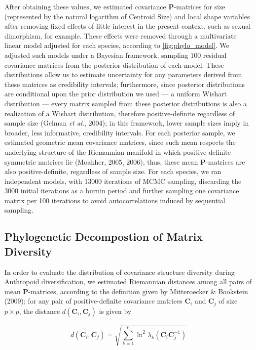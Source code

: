 \documentclass[12pt,twoside]{report}
\begin{document}
After obtaining these values, we estimated covariance
$\mathbf{P}$-matrices for size (represented by the natural logarithm of
Centroid Size) and local shape variables after removing fixed effects of
little interest in the present context, such as sexual dimorphism, for
example. These effects were removed through a multivariate linear model
adjusted for each species, according to \autoref{fig:phylo_model}. We
adjusted such models under a Bayesian framework, sampling $100$ residual
covariance matrices from the posterior distribution of each model. These
distributions allow us to estimate uncertainty for any parameters
derived from these matrices as credibility intervals; furthermore, since
posterior distributions are conditional upon the prior distribution we
used --- a uniform Wishart distribution --- every matrix sampled from
these posterior distributions is also a realization of a Wishart
distribution, therefore positive-definite regardless of sample size
(Gelman \emph{et al.}, 2004); in this framework, lower sample sizes
imply in broader, less informative, credibility intervals. For each
posterior sample, we estimated geometric mean covariance matrices, since
such mean respects the underlying structure of the Riemannian manifold
in which positive-definite symmetric matrices lie (Moakher, 2005, 2006);
thus, these mean $\mathbf{P}$-matrices are also positive-definite,
regardless of sample size. For each species, we ran independent models,
with 13000 iterations of MCMC sampling, discarding the 3000 initial
iterations as a burnin period and further sampling one covariance matrix
per 100 iterations to avoid autocorrelations induced by sequential
sampling.

\subsection{Phylogenetic Decompostion of Matrix
Diversity}\label{phylogenetic-decompostion-of-matrix-diversity}

In order to evaluate the distribution of covariance structure diversity
during Anthropoid diversification, we estimated Riemannian distances
among all pairs of mean $\mathbf{P}$-matrices, according to the
definition given by Mitteroecker \& Bookstein (2009); for any pair of
positive-definite covariance matrices $\mathbf{C}_i$ and $\mathbf{C}_j$
of size $p \times p$, the distance $d(\mathbf{C}_i, \mathbf{C}_j)$ is
given by

\begin{equation}
d(\mathbf{C}_i, \mathbf{C}_j) = \sqrt{\sum_{k = 1}^p \ln^2 \lambda_k(\mathbf{C}_i\mathbf{C}_j^{-1})}
\label{eq:riemdist}
\end{equation}
\end{document}
